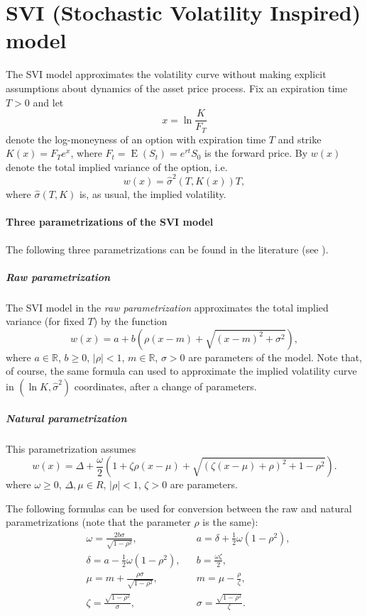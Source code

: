 \documentclass[a4paper,11pt,titlepage]{article}
\newcommand{\R}{\mathbb{R}}
\DeclareMathOperator{\E}{E}
\renewcommand{\hat}{\widehat}
\theoremstyle{remark}
\begin{document}
\section{SVI (Stochastic Volatility Inspired) model}
The SVI model \citep{Gatheral04} approximates the volatility curve without
making explicit assumptions about dynamics of the asset price process. Fix an
expiration time $T>0$ and let
\[
x = \ln\frac{K}{F_T}
\]
denote the log-moneyness of an option with expiration time $T$ and strike $K(x)
= F_Te^x$, where $F_t = \E(S_t) = e^{rt}S_0$ is the forward price. By $w(x)$
denote the total implied variance of the option, i.e.\
\[
w(x) = \hat \sigma^2(T, K(x)) T,
\]
where $\hat \sigma(T,K)$ is, as usual, the implied volatility.

\paragraph{Three parametrizations of the SVI model} 
The following three parametrizations can be found in the literature (see
\cite{GatheralJacquier14}).

\subparagraph{Raw parametrization} The SVI model in the \emph{raw
parametrization} approximates the total implied variance (for fixed $T$) by the
function
\[
w(x) = a + b\left( \rho(x-m) + \sqrt{(x-m)^2 + \sigma^2} \right),
\]
where $a\in\R$, $b\ge 0$, $|\rho|<1$, $m\in\R$, $\sigma>0$ are parameters of
the model. Note that, of course, the same formula can used to approximate the
implied volatility curve in $(\ln K, \hat\sigma^2)$ coordinates, after a change
of parameters.


\subparagraph{Natural parametrization} This parametrization assumes
\[
w(x) = \Delta + \frac{\omega}{2}
\left( 1 + \zeta\rho(x-\mu) + \sqrt{(\zeta(x-\mu)+\rho)^2 + 1-\rho^2} \right).
\]
where $\omega\ge 0$, $\Delta,\mu\in R$, $|\rho|<1$, $\zeta>0$ are parameters.

The following formulas can be used for conversion between the raw and natural
parametrizations (note that the parameter $\rho$ is the same):
\begin{align*}
&\omega = \frac{2b\sigma}{\sqrt{1-\rho^2}},&
  &a = \delta + \frac12 \omega(1-\rho^2),\\
&\delta = a-\frac12 \omega(1-\rho^2),&
  &b = \frac{\omega\zeta}{2},\\
&\mu = m + \frac{\rho\sigma}{\sqrt{1-\rho^2}},&
  &m = \mu-\frac{\rho}{\zeta},\\
&\zeta = \frac{\sqrt{1-\rho^2}}{\sigma},&
  &\sigma = \frac{\sqrt{1-\rho^2}}{\zeta}.
\end{align*}
\end{document}
